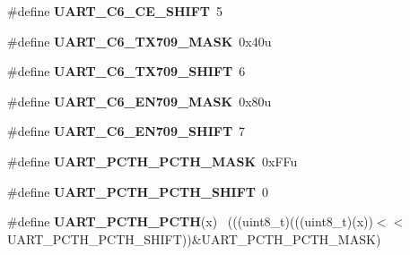 \begin{DoxyCompactItemize}
\item 
\hypertarget{group___u_a_r_t___register___masks_ga18bb5f9963eb65170c2b2bb5d728b4c8}{}\#define {\bfseries U\+A\+R\+T\+\_\+\+C6\+\_\+\+C\+E\+\_\+\+S\+H\+I\+F\+T}~5\label{group___u_a_r_t___register___masks_ga18bb5f9963eb65170c2b2bb5d728b4c8}

\item 
\hypertarget{group___u_a_r_t___register___masks_ga058c75596986d578768b191232e5cc83}{}\#define {\bfseries U\+A\+R\+T\+\_\+\+C6\+\_\+\+T\+X709\+\_\+\+M\+A\+S\+K}~0x40u\label{group___u_a_r_t___register___masks_ga058c75596986d578768b191232e5cc83}

\item 
\hypertarget{group___u_a_r_t___register___masks_gaf3d83447d28e52db0ca0eaa563b58240}{}\#define {\bfseries U\+A\+R\+T\+\_\+\+C6\+\_\+\+T\+X709\+\_\+\+S\+H\+I\+F\+T}~6\label{group___u_a_r_t___register___masks_gaf3d83447d28e52db0ca0eaa563b58240}

\item 
\hypertarget{group___u_a_r_t___register___masks_ga7ac8ff6c10e0ad5c15a98d42ce3c96c6}{}\#define {\bfseries U\+A\+R\+T\+\_\+\+C6\+\_\+\+E\+N709\+\_\+\+M\+A\+S\+K}~0x80u\label{group___u_a_r_t___register___masks_ga7ac8ff6c10e0ad5c15a98d42ce3c96c6}

\item 
\hypertarget{group___u_a_r_t___register___masks_ga7df14bf34650e7a00ead0602fcd8971f}{}\#define {\bfseries U\+A\+R\+T\+\_\+\+C6\+\_\+\+E\+N709\+\_\+\+S\+H\+I\+F\+T}~7\label{group___u_a_r_t___register___masks_ga7df14bf34650e7a00ead0602fcd8971f}

\item 
\hypertarget{group___u_a_r_t___register___masks_ga2179cb00a2939e5e952d53c1eca54aa8}{}\#define {\bfseries U\+A\+R\+T\+\_\+\+P\+C\+T\+H\+\_\+\+P\+C\+T\+H\+\_\+\+M\+A\+S\+K}~0x\+F\+Fu\label{group___u_a_r_t___register___masks_ga2179cb00a2939e5e952d53c1eca54aa8}

\item 
\hypertarget{group___u_a_r_t___register___masks_ga0b6847a3f9f71a3c958255841d0e16e0}{}\#define {\bfseries U\+A\+R\+T\+\_\+\+P\+C\+T\+H\+\_\+\+P\+C\+T\+H\+\_\+\+S\+H\+I\+F\+T}~0\label{group___u_a_r_t___register___masks_ga0b6847a3f9f71a3c958255841d0e16e0}

\item 
\hypertarget{group___u_a_r_t___register___masks_ga0f720723b2bc5c84328806f920121bc8}{}\#define {\bfseries U\+A\+R\+T\+\_\+\+P\+C\+T\+H\+\_\+\+P\+C\+T\+H}(x)                                            ~(((uint8\+\_\+t)(((uint8\+\_\+t)(x))$<$$<$U\+A\+R\+T\+\_\+\+P\+C\+T\+H\+\_\+\+P\+C\+T\+H\+\_\+\+S\+H\+I\+F\+T))\&U\+A\+R\+T\+\_\+\+P\+C\+T\+H\+\_\+\+P\+C\+T\+H\+\_\+\+M\+A\+S\+K)\label{group___u_a_r_t___register___masks_ga0f720723b2bc5c84328806f920121bc8}


\end{DoxyCompactItemize}
